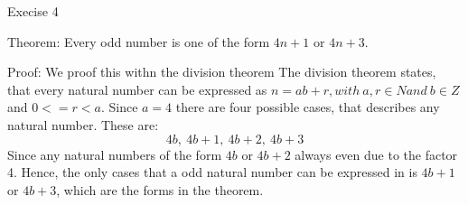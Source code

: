 \documentclass[12pt]{article}
\begin{document}
Execise 4

Theorem: Every odd number is one of the form $4n + 1$ or $4n + 3$.

Proof: We proof this withn the division theorem
The division theorem states, that every natural number can be expressed as $n = ab + r, with\: a, r \in N and\: b \in Z$ and $0<=r<a$. Since $a = 4$ there are four possible cases, that describes any natural number. These are:
\[4b,\: 4b+1,\: 4b+2,\: 4b+3\]
Since any natural numbers of the form $4b$ or $4b+2$ always even due to the factor 4. Hence, the only cases that a odd natural number can be expressed in is $4b+1$ or $4b+3$, which are the forms in the theorem.
\end{document}
